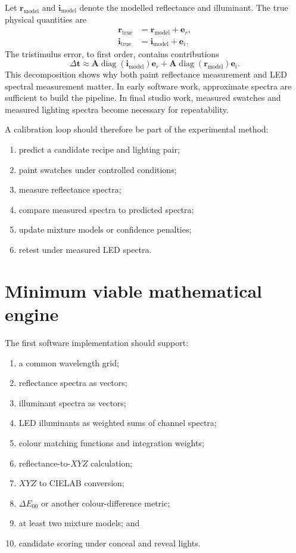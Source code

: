 \documentclass[11pt,a4paper]{article}
\newcommand{\diag}{\operatorname{diag}}
\newcommand{\vect}[1]{\boldsymbol{#1}}
\newcommand{\mat}[1]{\mathbf{#1}}
\newcommand{\DE}{\Delta E}
\begin{document}
Let $\vect{r}_{\mathrm{model}}$ and $\vect{i}_{\mathrm{model}}$ denote the modelled reflectance and illuminant. The true physical quantities are
\begin{align}
 \vect{r}_{\mathrm{true}} &= \vect{r}_{\mathrm{model}}+\vect{e}_r,\\
 \vect{i}_{\mathrm{true}} &= \vect{i}_{\mathrm{model}}+\vect{e}_i.
\end{align}
The tristimulus error, to first order, contains contributions
\begin{equation}
 \Delta\vect{t}
 \approx
 \mat{A}\diag(\vect{i}_{\mathrm{model}})\vect{e}_r
 +\mat{A}\diag(\vect{r}_{\mathrm{model}})\vect{e}_i.
 \label{eq:error_first_order}
\end{equation}
This decomposition shows why both paint reflectance measurement and LED spectral measurement matter. In early software work, approximate spectra are sufficient to build the pipeline. In final studio work, measured swatches and measured lighting spectra become necessary for repeatability.

A calibration loop should therefore be part of the experimental method:
\begin{enumerate}
  \item predict a candidate recipe and lighting pair;
  \item paint swatches under controlled conditions;
  \item measure reflectance spectra;
  \item compare measured spectra to predicted spectra;
  \item update mixture models or confidence penalties;
  \item retest under measured LED spectra.
\end{enumerate}

\section{Minimum viable mathematical engine}

The first software implementation should support:
\begin{enumerate}
  \item a common wavelength grid;
  \item reflectance spectra as vectors;
  \item illuminant spectra as vectors;
  \item LED illuminants as weighted sums of channel spectra;
  \item colour matching functions and integration weights;
  \item reflectance-to-$XYZ$ calculation;
  \item $XYZ$ to CIELAB conversion;
  \item $\DE_{00}$ or another colour-difference metric;
  \item at least two mixture models; and
  \item candidate scoring under conceal and reveal lights.
\end{enumerate}
\end{document}
